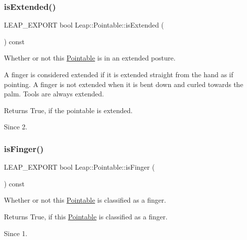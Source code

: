 \subsubsection{\texorpdfstring{is\+Extended()}{isExtended()}}
{\footnotesize\ttfamily L\+E\+A\+P\+\_\+\+E\+X\+P\+O\+RT bool Leap\+::\+Pointable\+::is\+Extended (\begin{DoxyParamCaption}{ }\end{DoxyParamCaption}) const}

Whether or not this \hyperlink{class_leap_1_1_pointable}{Pointable} is in an extended posture.

A finger is considered extended if it is extended straight from the hand as if pointing. A finger is not extended when it is bent down and curled towards the palm. Tools are always extended.


\begin{DoxyCodeInclude}
\end{DoxyCodeInclude}


\begin{DoxyReturn}{Returns}
True, if the pointable is extended. 
\end{DoxyReturn}
\begin{DoxySince}{Since}
2. 
\end{DoxySince}
\mbox{\label{class_leap_1_1_pointable_a4631ae19c9389e638c69f462b5bae35a}} 
\subsubsection{\texorpdfstring{is\+Finger()}{isFinger()}}
{\footnotesize\ttfamily L\+E\+A\+P\+\_\+\+E\+X\+P\+O\+RT bool Leap\+::\+Pointable\+::is\+Finger (\begin{DoxyParamCaption}{ }\end{DoxyParamCaption}) const}

Whether or not this \hyperlink{class_leap_1_1_pointable}{Pointable} is classified as a finger.


\begin{DoxyCodeInclude}
\end{DoxyCodeInclude}


\begin{DoxyReturn}{Returns}
True, if this \hyperlink{class_leap_1_1_pointable}{Pointable} is classified as a finger. 
\end{DoxyReturn}
\begin{DoxySince}{Since}
1. 
\end{DoxySince}
\mbox{\label{class_leap_1_1_pointable_a3ad1f5ced8d852a0f35de68c4c559ef3}} 

